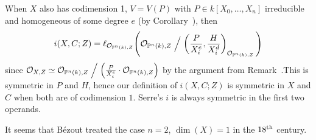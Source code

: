 \documentclass[a4paper,parskip=half,numbers=enddot, DIV=12]{scrreprt}
\begin{document}
\begin{rem*}
    When $X$ also has codimension 1, $V=V(P)$ with $P\in k[X_0,\ldots,X_n]$ irreducible and homogeneous of some degree $e$ (by Corollary~), then 
    \begin{align*}
        i(X,C;Z) = \ell_{\mathcal{O}_{\mathbb{P}^n(k), Z}}\Bigg(\mathcal{O}_{\mathbb{P}^n(k), Z} \Bigm/ \left( \frac{P}{X_i^e}, \frac{H}{X_i^d}\right)_{\mathcal{O}_{\mathbb{P}^n(k), Z}}\Bigg)
    \end{align*}
    since $\mathcal{O}_{X,Z}\simeq \mathcal{O}_{\mathbb{P}^n(k),Z}\Bigm/\left(\frac{P}{X_i^e}\cdot\mathcal{O}_{\mathbb{P}^n(k),Z}\right)$ by the argument from Remark~.This is symmetric in $P$ and $H$, hence our definition of $i(X,C;Z)$ is symmetric in $X$ and $C$ when both are of codimension $1$. Serre's $i$ is always symmetric in the first two operands.
    
    It seems that B\'ezout treated the case $n=2$, $\dim(X) = 1$ in the $18^{\text{th}}$ century.
\end{rem*}
\end{document}
